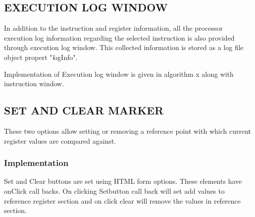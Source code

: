 \subsection {EXECUTION LOG WINDOW}

In addition to the instruction and register information, all the processor execution log information regarding the selected
instruction is also provided through execution log window.  This collected information is stored as a log file object propert "{\emph logInfo}". 

Implementation of Execution log window is given in algorithm x along with instruction window.

\subsection{SET AND CLEAR MARKER}
These two options allow setting or removing a reference point with which current register values are compared against.

\subsubsection{Implementation}

Set and Clear buttons are set using HTML form options. These elements have onClick call backs. On clicking Setbutton call back will set add values to reference register section and on click clear will remove the values in reference section.



